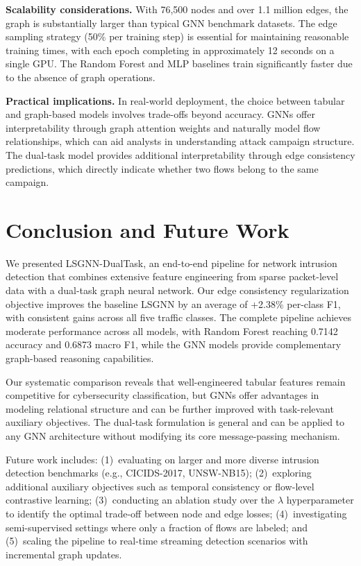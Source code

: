 \documentclass[conference]{IEEEtran}
\begin{document}
\textbf{Scalability considerations.} With 76{,}500 nodes and over 1.1 million edges, the graph is substantially larger than typical GNN benchmark datasets. The edge sampling strategy (50\% per training step) is essential for maintaining reasonable training times, with each epoch completing in approximately 12 seconds on a single GPU. The Random Forest and MLP baselines train significantly faster due to the absence of graph operations.

\textbf{Practical implications.} In real-world deployment, the choice between tabular and graph-based models involves trade-offs beyond accuracy. GNNs offer interpretability through graph attention weights and naturally model flow relationships, which can aid analysts in understanding attack campaign structure. The dual-task model provides additional interpretability through edge consistency predictions, which directly indicate whether two flows belong to the same campaign.

\section{Conclusion and Future Work}

We presented LSGNN-DualTask, an end-to-end pipeline for network intrusion detection that combines extensive feature engineering from sparse packet-level data with a dual-task graph neural network. Our edge consistency regularization objective improves the baseline LSGNN by an average of +2.38\% per-class F1, with consistent gains across all five traffic classes. The complete pipeline achieves moderate performance across all models, with Random Forest reaching 0.7142 accuracy and 0.6873 macro F1, while the GNN models provide complementary graph-based reasoning capabilities.

Our systematic comparison reveals that well-engineered tabular features remain competitive for cybersecurity classification, but GNNs offer advantages in modeling relational structure and can be further improved with task-relevant auxiliary objectives. The dual-task formulation is general and can be applied to any GNN architecture without modifying its core message-passing mechanism.

Future work includes: (1)~evaluating on larger and more diverse intrusion detection benchmarks (e.g., CICIDS-2017, UNSW-NB15); (2)~exploring additional auxiliary objectives such as temporal consistency or flow-level contrastive learning; (3)~conducting an ablation study over the $\lambda$ hyperparameter to identify the optimal trade-off between node and edge losses; (4)~investigating semi-supervised settings where only a fraction of flows are labeled; and (5)~scaling the pipeline to real-time streaming detection scenarios with incremental graph updates.
\end{document}
